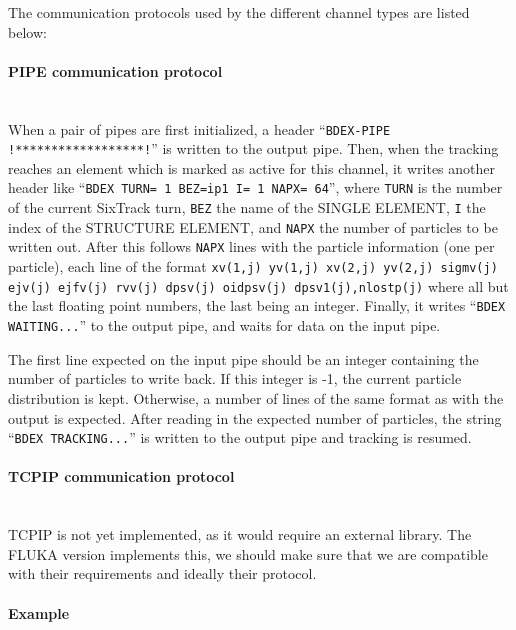 The communication protocols used by the different channel types are listed below:

\paragraph{PIPE communication protocol}~\\

When a pair of pipes are first initialized, a header ``\texttt{BDEX-PIPE !******************!}'' is written to the output pipe.
Then, when the tracking reaches an element which is marked as active for this channel, it writes another header like ``\texttt{BDEX TURN= 1 BEZ=ip1 I= 1 NAPX= 64}'', where \texttt{TURN} is the number of the current SixTrack turn, \texttt{BEZ} the name of the SINGLE ELEMENT, \texttt{I} the index of the STRUCTURE ELEMENT, and \texttt{NAPX} the number of particles to be written out.
After this follows \texttt{NAPX} lines with the particle information (one per particle), each line of the format \texttt{xv(1,j) yv(1,j) xv(2,j) yv(2,j) sigmv(j) ejv(j) ejfv(j) rvv(j) dpsv(j) oidpsv(j) dpsv1(j),nlostp(j)} where all but the last floating point numbers, the last being an integer.
Finally, it writes ``\texttt{BDEX WAITING...}'' to the output pipe, and waits for data on the input pipe.

The first line expected on the input pipe should be an integer containing the number of particles to write back.
If this integer is -1, the current particle distribution is kept.
Otherwise, a number of lines of the same format as with the output is expected.
After reading in the expected number of particles, the string ``\texttt{BDEX TRACKING...}'' is written to the output pipe and tracking is resumed.

\paragraph{TCPIP communication protocol}~\\

TCPIP is not yet implemented, as it would require an external library.
The FLUKA version implements this, we should make sure that we are compatible with their requirements and ideally their protocol.

\paragraph{Example}~\\


